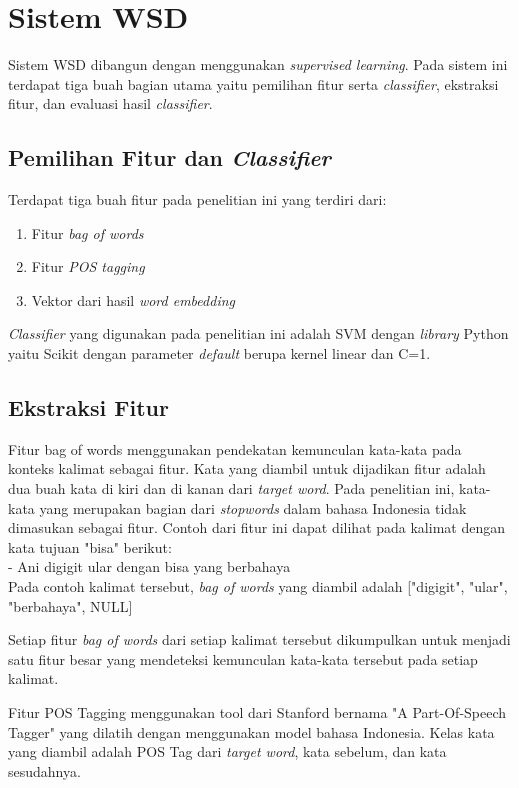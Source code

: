 \section{Sistem WSD}
Sistem WSD dibangun dengan menggunakan \textit{supervised learning}. Pada sistem ini terdapat tiga buah bagian utama yaitu pemilihan fitur serta \textit{classifier}, ekstraksi fitur, dan evaluasi hasil \textit{classifier}.

\subsection{Pemilihan Fitur dan \textit{Classifier}}
Terdapat tiga buah fitur pada penelitian ini yang terdiri dari:

\begin{enumerate}
	\item Fitur \textit{bag of words}
	\item Fitur \textit{POS tagging}
	\item Vektor dari hasil \textit{word embedding}
\end{enumerate}

\textit{Classifier} yang digunakan pada penelitian ini adalah SVM dengan \textit{library} Python yaitu Scikit dengan parameter \textit{default} berupa kernel linear dan C=1.

\subsection{Ekstraksi Fitur}
Fitur bag of words menggunakan pendekatan kemunculan kata-kata pada konteks kalimat sebagai fitur. Kata yang diambil untuk dijadikan fitur adalah dua buah kata di kiri dan di kanan dari \textit{target word}. Pada penelitian ini, kata-kata yang merupakan bagian dari \textit{stopwords} dalam bahasa Indonesia tidak dimasukan sebagai fitur. Contoh dari fitur ini dapat dilihat pada kalimat dengan kata tujuan "bisa" berikut:
\\
- Ani digigit ular dengan bisa yang berbahaya
\\
Pada contoh kalimat tersebut, \textit{bag of words} yang diambil adalah ["digigit", "ular", "berbahaya", NULL]

Setiap fitur \textit{bag of words} dari setiap kalimat tersebut dikumpulkan untuk menjadi satu fitur besar yang mendeteksi kemunculan kata-kata tersebut pada setiap kalimat.

Fitur POS Tagging menggunakan tool dari Stanford bernama "A Part-Of-Speech Tagger" yang dilatih dengan menggunakan model bahasa Indonesia. Kelas kata yang diambil adalah POS Tag dari \textit{target word}, kata sebelum, dan kata sesudahnya.

